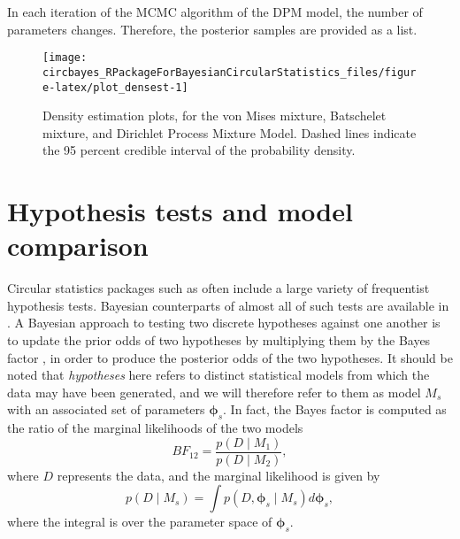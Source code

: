In each iteration of the MCMC algorithm of the DPM model, the number of
parameters changes. Therefore, the posterior samples are provided as a
list.

\begin{CodeChunk}
\begin{figure}

{\centering \texttt{[image: circbayes\_RPackageForBayesianCircularStatistics\_files/figure-latex/plot\_densest-1]} 

}

\caption[Density estimation plots, for the von Mises mixture, Batschelet mixture, and Dirichlet Process Mixture Model]{Density estimation plots, for the von Mises mixture, Batschelet mixture, and Dirichlet Process Mixture Model. Dashed lines indicate the 95 percent credible interval of the probability density.}\label{fig:plot_densest}
\end{figure}
\end{CodeChunk}

\hypertarget{hypothesis-tests-and-model-comparison}{%
\section{Hypothesis tests and model
comparison}\label{hypothesis-tests-and-model-comparison}}

\label{hyptest}

Circular statistics packages such as  often include a
large variety of frequentist hypothesis tests. Bayesian counterparts of
almost all of such tests are available in . A Bayesian
approach to testing two discrete hypotheses against one another is to
update the prior odds of two hypotheses by multiplying them by the Bayes
factor \citep{kass1995bayes, jeffreys1961theory}, in order to produce
the posterior odds of the two hypotheses. It should be noted that
\textit{hypotheses} here refers to distinct statistical models from
which the data may have been generated, and we will therefore refer to
them as model \(M_s\) with an associated set of parameters
\(\boldsymbol{\phi}_s\). In fact, the Bayes factor is computed as the
ratio of the marginal likelihoods of the two models \begin{equation}
BF_{12} = \frac{p(D \mid M_1)}{p(D \mid M_2)},
\end{equation} where \(D\) represents the data, and the marginal
likelihood is given by \begin{equation} \label{eqnjss:marglik}
p(D \mid M_s) = \int p(D, \boldsymbol{\phi}_s \mid M_s) d \boldsymbol{\phi}_s,
\end{equation} where the integral is over the parameter space of
\(\boldsymbol{\phi}_s.\)

